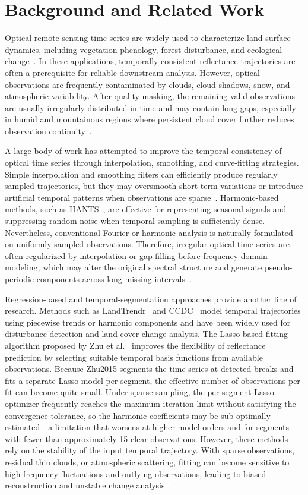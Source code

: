 \documentclass[letterpaper,journal]{IEEEtran}
\begin{document}
\section{Background and Related Work}
Optical remote sensing time series are widely used to characterize land-surface dynamics, including vegetation phenology, forest disturbance, and ecological change~\cite{ref1,ref2}. In these applications, temporally consistent reflectance trajectories are often a prerequisite for reliable downstream analysis. However, optical observations are frequently contaminated by clouds, cloud shadows, snow, and atmospheric variability. After quality masking, the remaining valid observations are usually irregularly distributed in time and may contain long gaps, especially in humid and mountainous regions where persistent cloud cover further reduces observation continuity~\cite{ref3,ref13}.

A large body of work has attempted to improve the temporal consistency of optical time series through interpolation, smoothing, and curve-fitting strategies. Simple interpolation and smoothing filters can efficiently produce regularly sampled trajectories, but they may oversmooth short-term variations or introduce artificial temporal patterns when observations are sparse~\cite{ref4}. Harmonic-based methods, such as HANTS~\cite{ref10}, are effective for representing seasonal signals and suppressing random noise when temporal sampling is sufficiently dense. Nevertheless, conventional Fourier or harmonic analysis is naturally formulated on uniformly sampled observations. Therefore, irregular optical time series are often regularized by interpolation or gap filling before frequency-domain modeling, which may alter the original spectral structure and generate pseudo-periodic components across long missing intervals~\cite{ref5}.

Regression-based and temporal-segmentation approaches provide another line of research. Methods such as LandTrendr~\cite{ref11} and CCDC~\cite{ref12} model temporal trajectories using piecewise trends or harmonic components and have been widely used for disturbance detection and land-cover change analysis. The Lasso-based fitting algorithm proposed by Zhu et al.~\cite{ref14} improves the flexibility of reflectance prediction by selecting suitable temporal basis functions from available observations. Because Zhu2015 segments the time series at detected breaks and fits a separate Lasso model per segment, the effective number of observations per fit can become quite small. Under sparse sampling, the per-segment Lasso optimizer frequently reaches the maximum iteration limit without satisfying the convergence tolerance, so the harmonic coefficients may be sub-optimally estimated---a limitation that worsens at higher model orders and for segments with fewer than approximately 15 clear observations. However, these methods rely on the stability of the input temporal trajectory. With sparse observations, residual thin clouds, or atmospheric scattering, fitting can become sensitive to high-frequency fluctuations and outlying observations, leading to biased reconstruction and unstable change analysis~\cite{ref7}.
\end{document}
